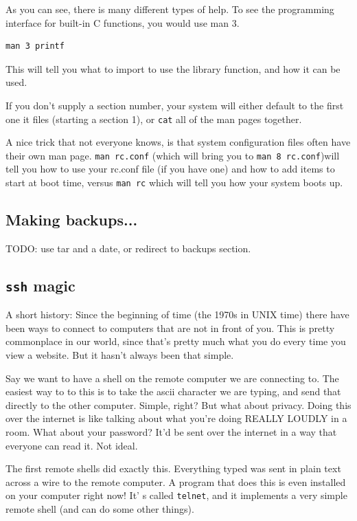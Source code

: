As you can see, there is many different types of help. To see the programming interface for 
built-in C functions, you would use man 3.

\begin{verbatim}
man 3 printf    
\end{verbatim}

This will tell you what to import to use the library function, and how it 
can be used.

If you don't supply a section number, your system will either default to the first one it files (starting a section 1), or {\tt cat}
all of the man pages together.

A nice trick that not everyone knows, is that system configuration files 
often have their own man page. {\tt man rc.conf} (which will bring you to {\tt man 8 rc.conf})will tell you 
how to use your rc.conf file (if you have one) and how to add items to start at boot time, versus {\tt man rc}
which will tell you how your system boots up.


\subsection {Making backups...} 
TODO: use tar and a date, or redirect to backups section.

\subsection {{\tt ssh} magic}

A short history: Since the beginning of time (the 1970s in UNIX time) there have been ways
to connect to computers that are not in front of you. This is pretty commonplace in our world, 
since that's pretty much what you do every time you view a website. But it hasn't 
always been that simple.

Say we want to have a shell on the remote computer we are connecting to. The easiest way 
to to this is to take the ascii character we are typing, and send that directly to the other
computer. Simple, right? But what about privacy. Doing this over the internet is like talking
about what you're doing REALLY LOUDLY in a room. What about your password? It'd be sent over the 
internet in a way that everyone can read it. Not ideal. 

The first remote shells did exactly this. Everything typed was sent in plain text across a wire to 
the remote computer. A program that does this is even installed on your computer right now! It' s
called {\tt telnet}, and it implements a very simple remote shell (and can do some other things).

